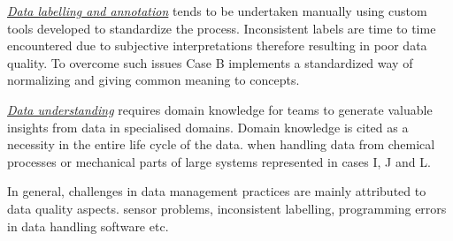 % 


\underline{\emph{Data labelling and annotation}} tends to be undertaken manually using custom tools developed to standardize the process. %
Inconsistent labels are time to time encountered due to subjective interpretations therefore resulting in poor data quality. To overcome such issues Case B implements a standardized way of normalizing and giving common meaning to concepts. %

\underline{\emph{Data understanding}} requires domain knowledge for teams to generate valuable insights from data in specialised domains. Domain knowledge is cited as a necessity in the entire life cycle of the data. \DIFdelbegin {}\DIFdelend \DIFaddbegin {}\DIFaddend when handling data from chemical processes or mechanical parts of large systems represented in cases I, J and L. %

In general, challenges in data management practices are mainly attributed to data quality aspects. \DIFdelbegin {}\DIFdelend \DIFaddbegin {}\DIFaddend sensor problems, inconsistent labelling, programming errors in data handling software etc.




